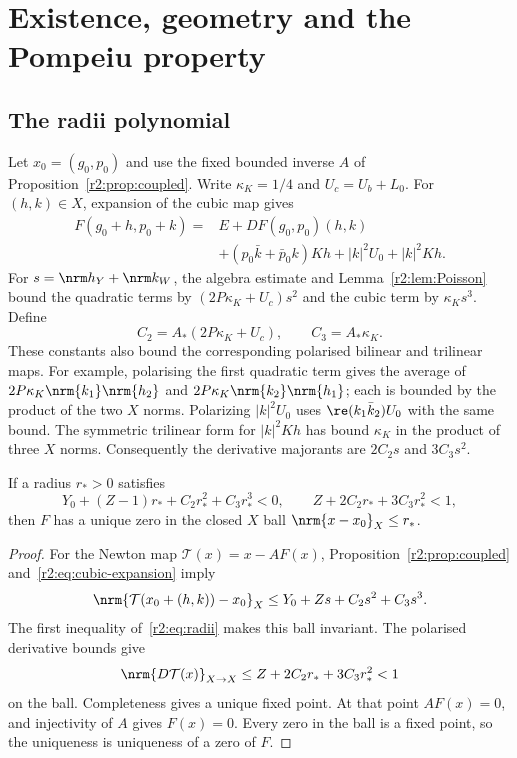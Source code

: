 \section{Existence, geometry and the Pompeiu property}\label{r2:sec:existence}

\subsection{The radii polynomial}
Let $x_0=(g_0,p_0)$ and use the fixed bounded inverse $A$ of Proposition~\ref{r2:prop:coupled}. Write $\kappa_K=1/4$ and $U_c=U_b+L_0$. For $(h,k)\in X$, expansion of the cubic map gives
\begin{equation}\label{r2:eq:cubic-expansion}
 \begin{split}
 F(g_0+h,p_0+k)={}&E+DF(g_0,p_0)(h,k)\\
 &+(p_0\bar k+\bar p_0k)Kh+|k|^2U_0+|k|^2Kh.
 \end{split}
\end{equation}
For $s=\nrm h_Y+\nrm k_W$, the algebra estimate and Lemma~\ref{r2:lem:Poisson} bound the quadratic terms by $(2P\kappa_K+U_c)s^2$ and the cubic term by $\kappa_Ks^3$. Define
\begin{equation}\label{r2:eq:C23}
 C_2=A_*(2P\kappa_K+U_c),\qquad C_3=A_*\kappa_K.
\end{equation}
These constants also bound the corresponding polarised bilinear and trilinear maps. For example, polarising the first quadratic term gives the average of $2P\kappa_K\nrm{k_1}\nrm{h_2}$ and $2P\kappa_K\nrm{k_2}\nrm{h_1}$; each is bounded by the product of the two $X$ norms. Polarizing $|k|^2U_0$ uses $\re(k_1\bar k_2)U_0$ with the same bound. The symmetric trilinear form for $|k|^2Kh$ has bound $\kappa_K$ in the product of three $X$ norms. Consequently the derivative majorants are $2C_2s$ and $3C_3s^2$.

\begin{lemma}\label{r2:lem:contraction}
If a radius $r_*>0$ satisfies
\begin{equation}\label{r2:eq:radii}
 Y_0+(Z-1)r_*+C_2r_*^2+C_3r_*^3<0,
 \qquad Z+2C_2r_*+3C_3r_*^2<1,
\end{equation}
then $F$ has a unique zero in the closed $X$ ball $\nrm{x-x_0}_X\le r_*$.
\end{lemma}
\begin{proof}
For the Newton map $\mathcal T(x)=x-AF(x)$, Proposition~\ref{r2:prop:coupled} and~\eqref{r2:eq:cubic-expansion} imply
\[
 \nrm{\mathcal T(x_0+(h,k))-x_0}_X
 \le Y_0+Zs+C_2s^2+C_3s^3.
\]
The first inequality of~\eqref{r2:eq:radii} makes this ball invariant. The polarised derivative bounds give
\[
 \nrm{D\mathcal T(x)}_{X\to X}\le Z+2C_2r_*+3C_3r_*^2<1
\]
on the ball. Completeness gives a unique fixed point. At that point $AF(x)=0$, and injectivity of $A$ gives $F(x)=0$. Every zero in the ball is a fixed point, so the uniqueness is uniqueness of a zero of $F$.
\end{proof}

